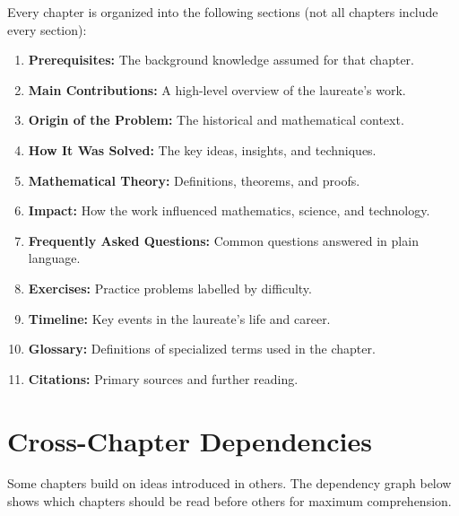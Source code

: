 Every chapter is organized into the following sections (not all chapters include every section):

\begin{enumerate}
    \item \textbf{Prerequisites:} The background knowledge assumed for that chapter.
    \item \textbf{Main Contributions:} A high-level overview of the laureate's work.
    \item \textbf{Origin of the Problem:} The historical and mathematical context.
    \item \textbf{How It Was Solved:} The key ideas, insights, and techniques.
    \item \textbf{Mathematical Theory:} Definitions, theorems, and proofs.
    \item \textbf{Impact:} How the work influenced mathematics, science, and technology.
    \item \textbf{Frequently Asked Questions:} Common questions answered in plain language.
    \item \textbf{Exercises:} Practice problems labelled by difficulty.
    \item \textbf{Timeline:} Key events in the laureate's life and career.
    \item \textbf{Glossary:} Definitions of specialized terms used in the chapter.
    \item \textbf{Citations:} Primary sources and further reading.
\end{enumerate}

\section{Cross-Chapter Dependencies}

Some chapters build on ideas introduced in others. The dependency graph below shows which chapters should be read before others for maximum comprehension.

